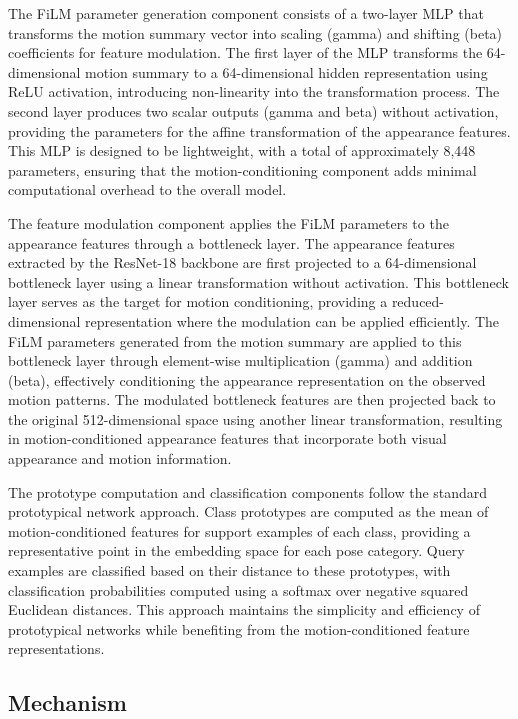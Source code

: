 \documentclass[11pt]{article}
\begin{document}
The FiLM parameter generation component consists of a two-layer MLP that transforms the motion summary vector into scaling (gamma) and shifting (beta) coefficients for feature modulation. The first layer of the MLP transforms the 64-dimensional motion summary to a 64-dimensional hidden representation using ReLU activation, introducing non-linearity into the transformation process. The second layer produces two scalar outputs (gamma and beta) without activation, providing the parameters for the affine transformation of the appearance features. This MLP is designed to be lightweight, with a total of approximately 8,448 parameters, ensuring that the motion-conditioning component adds minimal computational overhead to the overall model.

The feature modulation component applies the FiLM parameters to the appearance features through a bottleneck layer. The appearance features extracted by the ResNet-18 backbone are first projected to a 64-dimensional bottleneck layer using a linear transformation without activation. This bottleneck layer serves as the target for motion conditioning, providing a reduced-dimensional representation where the modulation can be applied efficiently. The FiLM parameters generated from the motion summary are applied to this bottleneck layer through element-wise multiplication (gamma) and addition (beta), effectively conditioning the appearance representation on the observed motion patterns. The modulated bottleneck features are then projected back to the original 512-dimensional space using another linear transformation, resulting in motion-conditioned appearance features that incorporate both visual appearance and motion information.

The prototype computation and classification components follow the standard prototypical network approach. Class prototypes are computed as the mean of motion-conditioned features for support examples of each class, providing a representative point in the embedding space for each pose category. Query examples are classified based on their distance to these prototypes, with classification probabilities computed using a softmax over negative squared Euclidean distances. This approach maintains the simplicity and efficiency of prototypical networks while benefiting from the motion-conditioned feature representations.

\subsection{Mechanism}
\end{document}
